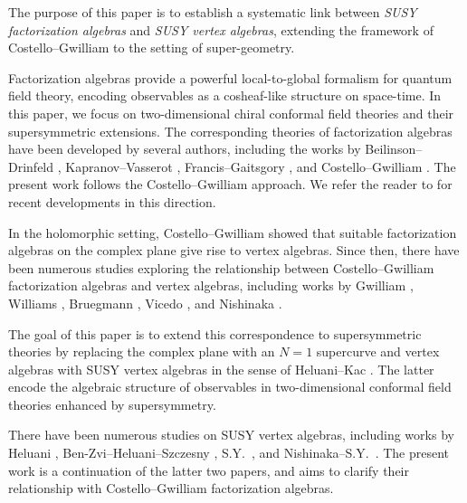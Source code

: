 \documentclass[final,reqno]{amsart}
\numberwithin{equation}{section}
\theoremstyle{definition}
\begin{document}
The purpose of this paper is to establish a systematic link between 
\emph{SUSY factorization algebras} and \emph{SUSY vertex algebras}, 
extending the framework of Costello--Gwilliam \cite{CG1,CG2} 
to the setting of super-geometry.

Factorization algebras provide a powerful local-to-global formalism
for quantum field theory, 
encoding observables as a cosheaf-like structure on space-time. 
In this paper, we focus on two-dimensional chiral conformal field theories 
and their supersymmetric extensions. 
The corresponding theories of factorization algebras 
have been developed by several authors, including the works by 
Beilinson--Drinfeld \cite{BD},
Kapranov--Vasserot \cite{KV1,KV2,KV3,KV4,KV5}, 
Francis--Gaitsgory \cite{FG}, 
and Costello--Gwilliam \cite{CG1,CG2}.
The present work follows the Costello--Gwilliam approach.
We refer the reader to \cite{CG,GW} for recent developments in this direction.

In the holomorphic setting, 
Costello--Gwilliam \cite[Chapter 5]{CG1} showed that suitable
factorization algebras on the complex plane give rise to vertex algebras. 
Since then, there have been numerous studies exploring the relationship 
between Costello--Gwilliam factorization algebras and vertex algebras, 
including works by Gwilliam \cite{G}, Williams \cite{Wil}, 
Bruegmann \cite{Br1,Br2}, Vicedo \cite{V}, and Nishinaka \cite{N1,N2}.

\medskip 

The goal of this paper is to extend this correspondence to supersymmetric 
theories by replacing the complex plane with an $N=1$ supercurve 
and vertex algebras with SUSY vertex algebras 
in the sense of Heluani--Kac \cite{HK}. 
The latter encode the algebraic structure of observables in two-dimensional
conformal field theories enhanced by supersymmetry.

There have been numerous studies on SUSY vertex algebras, 
including works by Heluani \cite{H1,H2}, Ben-Zvi--Heluani--Szczesny \cite{BHS},
S.Y.\ \cite{Y}, and Nishinaka--S.Y.\ \cite{NY}. 
The present work is a continuation of the latter two papers, and 
aims to clarify their relationship with Costello--Gwilliam factorization algebras.

\medskip 
\end{document}
